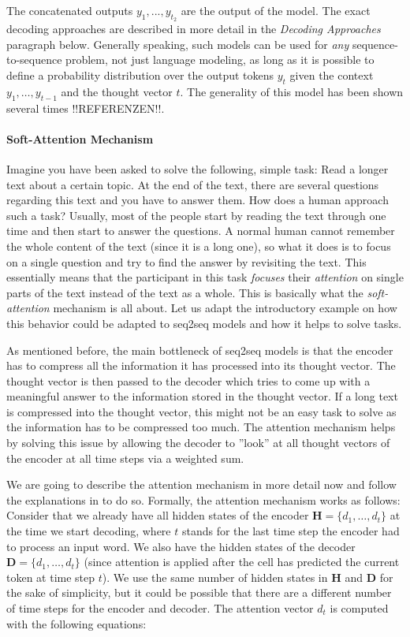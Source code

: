 The concatenated outputs $y_1,...,y_{t_2}$ are the output of the model. The exact decoding approaches are described in more detail in the \emph{Decoding Approaches} paragraph below. Generally speaking, such models can be used for \emph{any} sequence-to-sequence problem, not just language modeling, as long as it is possible to define a probability distribution over the output tokens $y_t$ given the context $y_1,\dots,y_{t-1}$ and the thought vector $t$. The generality of this model has been shown several times !!REFERENZEN!!.

\paragraph{Soft-Attention Mechanism}
Imagine you have been asked to solve the following, simple task: Read a longer text about a certain topic. At the end of the text, there are several questions regarding this text and you have to answer them. How does a human approach such a task? Usually, most of the people start by reading the text through one time and then start to answer the questions. A normal human cannot remember the whole content of the text (since it is a long one), so what it does is to focus on a single question and try to find the answer by revisiting the text. This essentially means that the participant in this task \emph{focuses} their \emph{attention} on single parts of the text instead of the text as a whole. This is basically what the \emph{soft-attention} mechanism is all about. Let us adapt the introductory example on how this behavior could be adapted to seq2seq models and how it helps to solve tasks.

As mentioned before, the main bottleneck of seq2seq models is that the encoder has to compress all the information it has processed into its thought vector. The thought vector is then passed to the decoder which tries to come up with a meaningful answer to the information stored in the thought vector. If a long text is compressed into the thought vector, this might not be an easy task to solve as the information has to be compressed too much. The attention mechanism helps by solving this issue by allowing the decoder to ''look'' at all thought vectors of the encoder at all time steps via a weighted sum.

We are going to describe the attention mechanism in more detail now and follow the explanations in \cite{Vinyals:2015} to do so. Formally, the attention mechanism works as follows: Consider that we already have all hidden states of the encoder $\mathbf{H} = \{d_1,\dots,d_t\}$ at the time we start decoding, where $t$ stands for the last time step the encoder had to process an input word. We also have the hidden states of the decoder $\mathbf{D} = \{d_1,\dots,d_t\}$ (since attention is applied after the cell has predicted the current token at time step $t$). We use the same number of hidden states in $\mathbf{H}$ and $\mathbf{D}$ for the sake of simplicity, but it could be possible that there are a different number of time steps for the encoder and decoder. The attention vector $d_t$ is computed with the following equations:

